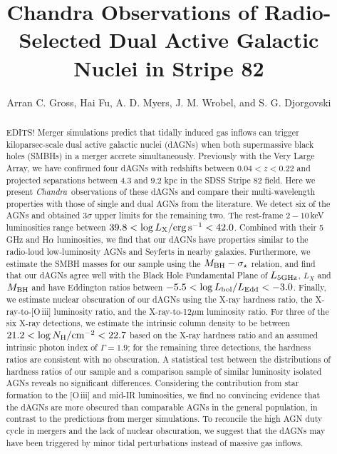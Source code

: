 \documentclass[iop,revtex4,twocolumn,apj,numberedappendix,appendixfloats]{emulateapj}
\newcommand{\chandra}{{\it Chandra}}
\begin{document}
\title{Chandra Observations of Radio-Selected Dual Active Galactic Nuclei in Stripe 82}

\author{
Arran C. Gross, 
Hai Fu, 
A. D. Myers,
J. M. Wrobel, and
S. G. Djorgovski
}

\begin{abstract}
EDITS!
Merger simulations predict that tidally induced gas inflows can trigger kiloparsec-scale dual active galactic nuclei (dAGNs) when both supermassive black holes (SMBHs) in a merger accrete simultaneously. Previously with the Very Large Array, we have confirmed four dAGNs with redshifts between $0.04 < z < 0.22$ and projected separations between 4.3 and 9.2 kpc in the SDSS Stripe 82 field. Here we present \chandra\, observations of these dAGNs and compare their multi-wavelength properties with those of single and dual AGNs from the literature. We detect six of the AGNs and obtained 3$\sigma$ upper limits for the remaining two. The rest-frame $2-10$\,keV luminosities range between $39.8 < \log L_{\rm X}/{\rm erg\,s^{-1}} < 42.0$. Combined with their 5\,GHz and H$\alpha$ luminosities, we find that our dAGNs have properties similar to the radio-loud low-luminosity AGNs and Seyferts in nearby galaxies. Furthermore, we estimate the SMBH masses for our sample using the $M_{\rm BH}-\sigma_\star$ relation, and find that our dAGNs agree well with the Black Hole Fundamental Plane of $L_{\rm 5GHz}$, $L_X$ and $M_{\rm BH}$ and have Eddington ratios between $-5.5 < \log L_{\rm bol}/L_{\rm Edd} < -3.0$. Finally, we estimate nuclear obscuration of our dAGNs using the X-ray hardness ratio, the X-ray-to-[O\,{\sc iii}] luminosity ratio, and the X-ray-to-12$\mu$m luminosity ratio. For three of the six X-ray detections, we estimate the intrinsic column density to be between $21.2 < \log N_{\rm H}/{\rm cm^{-2}} < 22.7$ based on the X-ray hardness ratio and an assumed intrinsic photon index of $\Gamma = 1.9$; for the remaining three detections, the hardness ratios are consistent with no obscuration. A statistical test between the distributions of hardness ratios of our sample and a comparison sample of similar luminosity isolated AGNs reveals no significant differences. Considering the  contribution from star formation to the [O\,{\sc iii}] and mid-IR luminosities, we find no convincing evidence that the dAGNs are more obscured than comparable AGNs in the general population, in contrast to the predictions from merger simulations. To reconcile the high AGN duty cycle in mergers and the lack of nuclear obscuration, we suggest that the dAGNs may have been triggered by minor tidal perturbations instead of massive gas inflows. 
\end{abstract}
\end{document}
